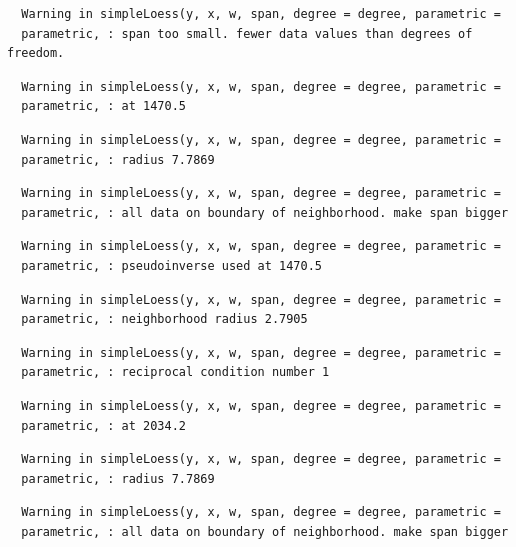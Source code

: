 \documentclass[12pt,twoside]{reedthesis}
\begin{document}
  \begin{verbatim}
  Warning in simpleLoess(y, x, w, span, degree = degree, parametric =
  parametric, : span too small. fewer data values than degrees of freedom.
  \end{verbatim}
  
  \begin{verbatim}
  Warning in simpleLoess(y, x, w, span, degree = degree, parametric =
  parametric, : at 1470.5
  \end{verbatim}
  
  \begin{verbatim}
  Warning in simpleLoess(y, x, w, span, degree = degree, parametric =
  parametric, : radius 7.7869
  \end{verbatim}
  
  \begin{verbatim}
  Warning in simpleLoess(y, x, w, span, degree = degree, parametric =
  parametric, : all data on boundary of neighborhood. make span bigger
  \end{verbatim}
  
  \begin{verbatim}
  Warning in simpleLoess(y, x, w, span, degree = degree, parametric =
  parametric, : pseudoinverse used at 1470.5
  \end{verbatim}
  
  \begin{verbatim}
  Warning in simpleLoess(y, x, w, span, degree = degree, parametric =
  parametric, : neighborhood radius 2.7905
  \end{verbatim}
  
  \begin{verbatim}
  Warning in simpleLoess(y, x, w, span, degree = degree, parametric =
  parametric, : reciprocal condition number 1
  \end{verbatim}
  
  \begin{verbatim}
  Warning in simpleLoess(y, x, w, span, degree = degree, parametric =
  parametric, : at 2034.2
  \end{verbatim}
  
  \begin{verbatim}
  Warning in simpleLoess(y, x, w, span, degree = degree, parametric =
  parametric, : radius 7.7869
  \end{verbatim}
  
  \begin{verbatim}
  Warning in simpleLoess(y, x, w, span, degree = degree, parametric =
  parametric, : all data on boundary of neighborhood. make span bigger
  \end{verbatim}
  
\end{document}
